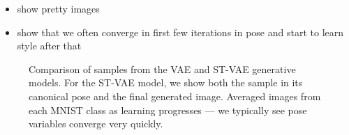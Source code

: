 \begin{itemize}
\item show pretty images
\item show that we often converge in first few iterations in pose and start to learn style after that
\end{itemize}






\begin{figure}[t]
\begin{center}
\qquad
{}
\end{center}
 \caption{
  Comparison of samples from the VAE and ST-VAE generative models.  
 For the ST-VAE model, we show both the sample in its canonical pose and the final generated image.
    Averaged images from each MNIST class as learning progresses ---
  we typically see pose variables converge very quickly.
 }
\end{figure}

